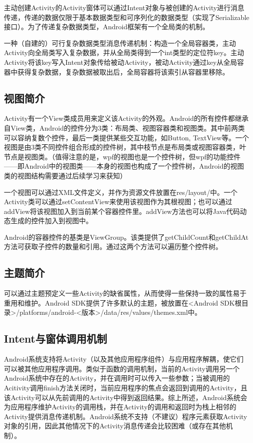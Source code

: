 \documentclass[UTF8]{ctexart}
\begin{document}
	主动创建Activity的Activity窗体可以通过Intent对象与被创建的Activity进行消息传递，传递的数据仅限于基本数据类型和可序列化的数据类型（实现了Serializable接口）。为了传递复杂数据类型，Android框架有一个全局类的机制。

	一种（自建的）可行复杂数据类型消息传递机制：构造一个全局容器类，主动Activity向全局类写入复杂数据，并从全局类得到一个int类型的定位符key。主动Activity将该key写入Intent对象传给被动Activity，被动Activity通过key从全局容器中获得复杂数据，复杂数据被取出后，全局容器将该索引从容器里移除。
	\subsection{视图简介}
	Activity有一个View类成员用来定义该Activity的外观。Android的所有控件都继承自View类，Android的控件分为3类：布局类、视图容器类和视图类。其中前两类可以容纳复数个控件，最后一类提供某些交互功能，如Button, TextView等。一个视图是由3类不同控件组合形成的控件树，其中枝节点是布局类或视图容器类，叶节点是视图类。（值得注意的是，wpf的视图也是一个控件树，但wpf的功能控件——即Android中的视图类——本身的视图也构成了一个控件树，Android的视图类的视图结构需要通过后续学习来获知）

	一个视图可以通过XML文件定义，并作为资源文件放置在res/layout/中。一个Activity类可以通过setContentView来使用该视图作为其根视图；也可以通过addView将该视图加入到当前某个容器控件里。addView方法也可以将Java代码动态生成的控件加入到视图中。

	Android的容器控件的基类是ViewGroup。该类提供了getChildCount和getChildAt方法可获取子控件的数量和引用。通过这两个方法可以遍历整个控件树。
	\subsection{主题简介}
	可以通过主题预定义一些Activity的缺省属性，从而使得一些保持一致的属性易于重用和维护。Android SDK提供了许多默认的主题，被放置在<Android SDK根目录>/platforms/android-<版本>/data/res/values/themes.xml中。
	\subsection{Intent与窗体调用机制}
	Android系统支持将Activity（以及其他应用程序组件）与应用程序解耦，使它们可以被其他应用程序调用。类似于函数的调用机制，当前的Activity调用另一个Android系统中存在的Activity，并在调用时可以传入一些参数；当被调用的Acitivity调用finish方法关闭时，当前应用程序的焦点会返回到调用的Activity，且该Activity可以从先前调用的Activity中得到返回结果。综上所述，Android系统会为应用程序维护Activity的调用栈，并在Activity的调用和返回时为栈上相邻的Activity提供消息传递机制。Android系统不支持（不建议）程序元素获取Activity对象的引用，因此其他情况下的Activity消息传递会比较困难（或存在其他机制）。
\end{document}
